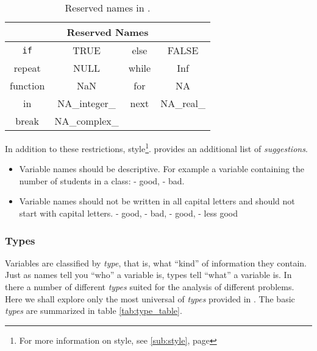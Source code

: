 \documentclass[10pt,letterpaper]{article}
\begin{document}
\begin{table}[htbp]
  \begin{center}
    \begin{tabular}{cccc}
      \toprule
      \multicolumn{4}{c}{\textnormal{Reserved Names}} \\
      \midrule\tt
      if & TRUE & else & FALSE \\
      repeat & NULL & while & Inf \\
      function & NaN & for & NA \\
      in & NA\_integer\_ & next & NA\_real\_ \\
      break & NA\_complex\_ \\
      \bottomrule
    \end{tabular}
    \caption{\label{tab:reserved_names}Reserved names in \R.}
  \end{center}
\end{table}

In addition to these restrictions, style\footnote{For more information on style, see \ref{sub:style}, page \pageref{sub:style}}. provides an additional list of \emph{suggestions}.

\begin{itemize}
  \item Variable names should be descriptive.  For example a variable containing the number of students in a class:   - good,  - bad.
  \item Variable names should not be written in all capital letters and should not start with capital letters.   - good,  - bad,  - good,  - less good
\end{itemize}


\subsubsection{Types} %
\label{subs:v_types}

Variables are classified by \emph{type}, that is, what ``kind'' of information they contain.  Just as names tell you ``who'' a variable is, types tell ``what'' a variable is.  In \R there a number of different \emph{types} suited for the analysis of different problems.  Here we shall explore only the most universal of \emph{types} provided in \R.  The basic \emph{types} are summarized in table \ref{tab:type_table}.
\end{document}
